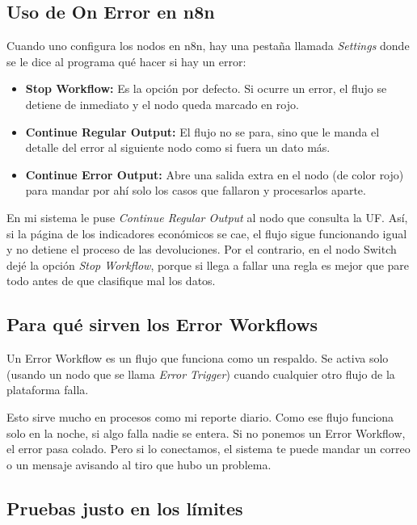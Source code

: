 \documentclass[11pt,letterpaper]{article}
\begin{document}
\subsection{Uso de On Error en n8n}

Cuando uno configura los nodos en n8n, hay una pestaña llamada \textit{Settings} donde se le dice al programa qué hacer si hay un error:
\begin{itemize}[leftmargin=1.5em, itemsep=2pt]
    \item \textbf{Stop Workflow:} Es la opción por defecto. Si ocurre un error, el flujo se detiene de inmediato y el nodo queda marcado en rojo.
    \item \textbf{Continue Regular Output:} El flujo no se para, sino que le manda el detalle del error al siguiente nodo como si fuera un dato más.
    \item \textbf{Continue Error Output:} Abre una salida extra en el nodo (de color rojo) para mandar por ahí solo los casos que fallaron y procesarlos aparte.
\end{itemize}

En mi sistema le puse \textit{Continue Regular Output} al nodo que consulta la UF. Así, si la página de los indicadores económicos se cae, el flujo sigue funcionando igual y no detiene el proceso de las devoluciones. Por el contrario, en el nodo Switch dejé la opción \textit{Stop Workflow}, porque si llega a fallar una regla es mejor que pare todo antes de que clasifique mal los datos.

\subsection{Para qué sirven los Error Workflows}

Un Error Workflow es un flujo que funciona como un respaldo. Se activa solo (usando un nodo que se llama \textit{Error Trigger}) cuando cualquier otro flujo de la plataforma falla. 

Esto sirve mucho en procesos como mi reporte diario. Como ese flujo funciona solo en la noche, si algo falla nadie se entera. Si no ponemos un Error Workflow, el error pasa colado. Pero si lo conectamos, el sistema te puede mandar un correo o un mensaje avisando al tiro que hubo un problema.

\subsection{Pruebas justo en los límites}
\end{document}
